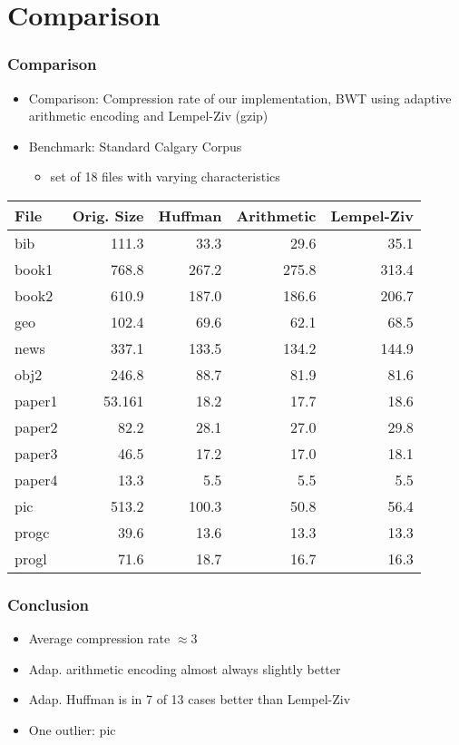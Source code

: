 \section{Comparison}

\begin{frame}
	\frametitle{Comparison}
	\begin{itemize}
		\item Comparison: Compression rate of our implementation, BWT using adaptive arithmetic encoding and Lempel-Ziv (gzip)
		\item Benchmark: Standard Calgary Corpus
		\begin{itemize}
			\item set of 18 files with varying characteristics
		\end{itemize}
	\end{itemize}
\end{frame}

\begin{frame}
\small
\begin{tabular}{l|rrrr}
File & Orig. Size& Huffman & Arithmetic& Lempel-Ziv\\
\hline
bib & 111.3 & 33.3 & 29.6 & 35.1\\
book1 & 768.8 & 267.2 & 275.8 & 313.4\\
book2& 610.9 & 187.0 & 186.6 & 206.7\\
geo & 102.4 & 69.6 & 62.1 & 68.5 \\
news & 337.1 & 133.5 & 134.2 & 144.9 \\
obj2 & 246.8 & 88.7 & 81.9 & 81.6\\
paper1 & 53.161 & 18.2 & 17.7 & 18.6 \\
paper2 & 82.2 & 28.1 & 27.0 & 29.8\\
paper3 & 46.5 & 17.2 & 17.0 & 18.1\\
paper4 & 13.3 & 5.5 & 5.5 & 5.5\\
pic & 513.2 & 100.3 & 50.8 & 56.4 \\
progc & 39.6 & 13.6 & 13.3 & 13.3 \\
progl & 71.6 & 18.7 & 16.7 & 16.3
\end{tabular}

\end{frame}

\begin{frame}
	\frametitle{Conclusion}
	\begin{itemize}
		\item Average compression rate $\approx 3$
		\item Adap. arithmetic encoding almost always slightly better
		\item Adap. Huffman is in 7 of 13 cases better than Lempel-Ziv
		\item One outlier: pic
	\end{itemize}
\end{frame}
